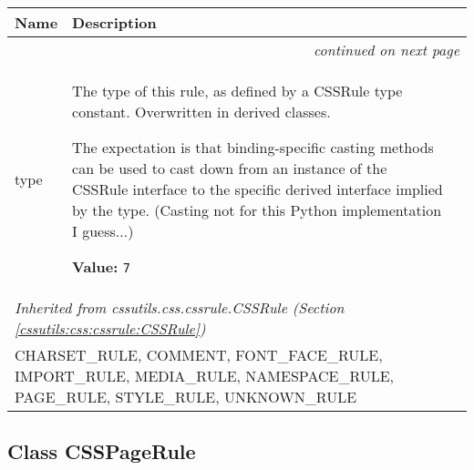     \vspace{-1cm}
\hspace{\varindent}\begin{longtable}{|p{\varnamewidth}|p{\vardescrwidth}|l}
\cline{1-2}
\cline{1-2} \centering \textbf{Name} & \centering \textbf{Description}& \\
\cline{1-2}
\endhead\cline{1-2}\multicolumn{3}{r}{\small\textit{continued on next page}}\\\endfoot\cline{1-2}
\endlastfoot\raggedright t\-y\-p\-e\- & \raggedright The type of this rule, as defined by a CSSRule type constant.
Overwritten in derived classes.

The expectation is that binding-specific casting methods can be used to
cast down from an instance of the CSSRule interface to the specific
derived interface implied by the type.
(Casting not for this Python implementation I guess...)

\textbf{Value:} 
{\tt 7}&\\
\cline{1-2}
\multicolumn{2}{|l|}{\textit{Inherited from cssutils.css.cssrule.CSSRule \textit{(Section \ref{cssutils:css:cssrule:CSSRule})}}}\\
\multicolumn{2}{|p{\varwidth}|}{\raggedright CHARSET\_RULE, COMMENT, FONT\_FACE\_RULE, IMPORT\_RULE, MEDIA\_RULE, NAMESPACE\_RULE, PAGE\_RULE, STYLE\_RULE, UNKNOWN\_RULE}\\
\cline{1-2}
\end{longtable}



\subsection{Class CSSPageRule}

